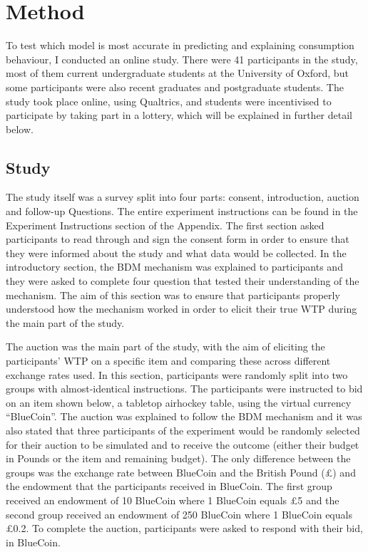 \documentclass[
]{report}
\begin{document}
\chapter{Method}\label{method}

To test which model is most accurate in predicting and explaining
consumption behaviour, I conducted an online study. There were 41
participants in the study, most of them current undergraduate students
at the University of Oxford, but some participants were also recent
graduates and postgraduate students. The study took place online, using
Qualtrics, and students were incentivised to participate by taking part
in a lottery, which will be explained in further detail below.

\section{Study}\label{study}

The study itself was a survey split into four parts: consent,
introduction, auction and follow-up Questions. The entire experiment
instructions can be found in the Experiment Instructions section of the
Appendix. The first section asked participants to read through and sign
the consent form in order to ensure that they were informed about the
study and what data would be collected. In the introductory section, the
BDM mechanism was explained to participants and they were asked to
complete four question that tested their understanding of the mechanism.
The aim of this section was to ensure that participants properly
understood how the mechanism worked in order to elicit their true WTP
during the main part of the study.

The auction was the main part of the study, with the aim of eliciting
the participants' WTP on a specific item and comparing these across
different exchange rates used. In this section, participants were
randomly split into two groups with almost-identical instructions. The
participants were instructed to bid on an item shown below, a tabletop
airhockey table, using the virtual currency ``BlueCoin''. The auction
was explained to follow the BDM mechanism and it was also stated that
three participants of the experiment would be randomly selected for
their auction to be simulated and to receive the outcome (either their
budget in Pounds or the item and remaining budget). The only difference
between the groups was the exchange rate between BlueCoin and the
British Pound (£) and the endowment that the participants received in
BlueCoin. The first group received an endowment of 10 BlueCoin where 1
BlueCoin equals £5 and the second group received an endowment of 250
BlueCoin where 1 BlueCoin equals £0.2. To complete the auction,
participants were asked to respond with their bid, in BlueCoin.
\end{document}
